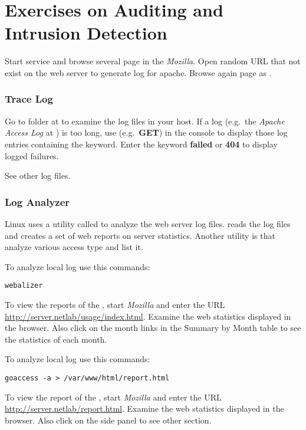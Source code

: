 \documentclass{../UTNetLab}
\begin{document}
\part{Exercises on Auditing and Intrusion Detection}
    Start  service and browse several page in the \textit{Mozilla}.
    Open random URL that not exist on the web server to generate log for apache.
    Browse again page as .

\section{Trace Log}
    Go to  folder at  to examine the log files in your host.
    If a log (e.g.\ the \textit{Apache Access Log} at ) is too long, use  (e.g.\ \textbf{GET}) in the {console} to display those log entries containing the keyword.
    Enter the keyword \textbf{failed} or \textbf{404} to display logged failures.

    See other log files.

\section{Log Analyzer}
    Linux uses a utility called  to analyze the web server log files.
     reads the  log files and creates a set of web reports on server statistics.
    Another utility is  that analyze various access type and list it.

    To analyze local log use this commands:
    \begin{lstlisting}
webalizer
    \end{lstlisting}
    
    To view the reports of the , start \textit{Mozilla} and enter the URL \url{http://server.netlab/usage/index.html}.
    Examine the web statistics displayed in the browser.
    Also click on the month links in the Summary by Month table to see the statistics of each month.

    To analyze local log use this commands:
    \begin{lstlisting}
goaccess -a > /var/www/html/report.html
    \end{lstlisting}
    
    To view the report of the , start \textit{Mozilla} and enter the URL \url{http://server.netlab/report.html}.
    Examine the web statistics displayed in the browser.
    Also click on the side panel to see other section.
\end{document}
